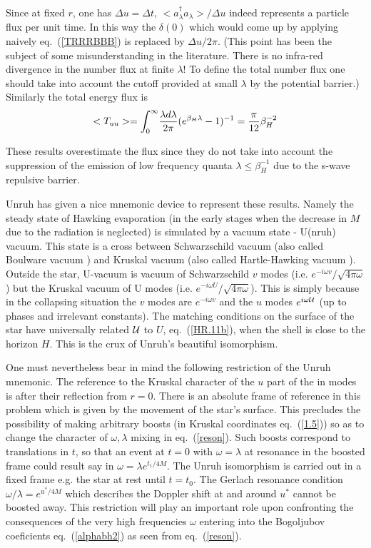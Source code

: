 \documentclass[12pt,oneside]{report}
\def\om{\omega	}
\def\la{\lambda}
\begin{document}
Since at fixed $r$, one has $ \Delta u = \Delta t$, 
$ <a^\dagger_\la a_\la > 
/ \Delta u$ indeed represents a particle flux 
per unit time. In this way the $\delta(0)$ which would come up by applying
naively eq.~(\ref{TRRRBBB}) is replaced by $\Delta u /2 \pi$. (This point has
been the subject of some misunderstanding in the literature. There is no
infra-red divergence in the number flux at finite $\la$! To define the total
number flux one should take into account the cutoff provided at small $\la$ by
the potential barrier.)
Similarly the
total energy flux is 
\begin {eqnarray}
< T_{uu} > = 
\int _{0} ^{\infty} \! {\lambda d \lambda \over 2 \pi}
( e^{
\beta_H \lambda} - 1 ) ^{-1} = { \pi \over 12} \beta_H^{-2} \label {1.38}
\end {eqnarray}

These results overestimate the flux since they do not take into account the
suppression of the emission of low frequency quanta $ \lambda \leq
\beta_H^{-1}$ due to the s-wave repulsive barrier. 

Unruh \cite{Unru1} has given a nice mnemonic device to represent these
results. Namely the steady state of Hawking evaporation (in the early stages
when the decrease in $M$ due to the radiation is neglected) is simulated by a
vacuum state - U(nruh) vacuum. This state is a cross between Schwarzschild
vacuum (also called Boulware vacuum \cite{Boul1}) and Kruskal vacuum (also called
Hartle-Hawking vacuum \cite{HaHa}). Outside the star, U-vacuum is vacuum of
Schwarzschild $v$
 modes (i.e. $e^{-i \omega v}/ \sqrt{4 \pi \omega}$) but the
Kruskal vacuum of U modes (i.e. $e^{-i \omega U}/ \sqrt{4 \pi \omega}$). 
This is simply
because in the collapsing situation the $v$ modes are $ e^{-i\omega v}$  
and the $u$ 
modes $ e^{i \omega  {\cal{U}} }$ (up to phases and irrelevant constants). The 
matching
conditions on the surface of the star have universally
related $ {\cal{U}} $ to 
$U$, eq.~(\ref{HR.11b}), when the shell is close to the horizon $H$.
This is the crux of Unruh's beautiful
isomorphism. 

One must nevertheless bear in mind the following
restriction of the Unruh mnemonic.
The reference to the Kruskal character of the $u$ part of the in modes is
after their reflection from $ r = 0 $. There is an absolute frame of
reference in this problem which is given by the movement of the star's
surface. This precludes the possibility of making arbitrary boosts 
(in Kruskal coordinates eq.~(\ref{1.5})) so as to
change the character of $ \omega, \lambda$ mixing in eq.~(\ref{reson}). 
Such boosts correspond to
translations in $t$, so that an event at $ t = 0 $
with $ \omega = \lambda$ at resonance in the boosted frame could result say in
$ \omega = \lambda e^{t_1/4M}$. The Unruh isomorphism is carried out in a
fixed frame e.g. the star at rest until $ t = t_0 $. 
The Gerlach resonance condition $ \omega / \lambda = e^{u^*/4M}$ 
which describes the
Doppler shift at and around $u^*$ cannot be boosted away.
This restriction will play an important role upon confronting the 
consequences of the very high frequencies $\om$
entering into the Bogoljubov coeficients eq.~(\ref{alphabh2})
as seen from eq.~(\ref{reson}).
\end{document}
